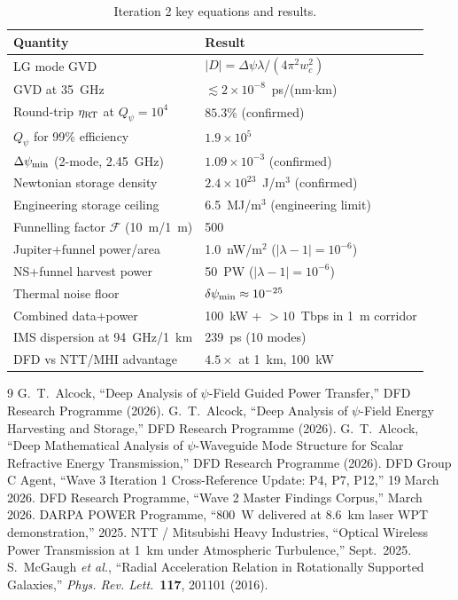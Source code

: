\documentclass[aps,prd,twocolumn,superscriptaddress,nofootinbib]{revtex4-2}
\newcommand{\Qpsi}{Q_\psi}
\begin{document}
\begin{table}[h]
\caption{Iteration 2 key equations and results.}
\label{tab:key-eqs}
\begin{ruledtabular}
\begin{tabular}{ll}
Quantity & Result \\
\hline
LG mode GVD & $|D| = \Delta\psi\lambda/(4\pi^2 w_c^2)$ \\
GVD at 35~GHz & $\lesssim 2\times10^{-8}$~ps/(nm$\cdot$km) \\
Round-trip $\eta_{\rm RT}$ at $\Qpsi=10^4$ & $85.3\%$ (confirmed) \\
$\Qpsi$ for 99\% efficiency & $1.9\times10^5$ \\
$\Delta\psi_{\rm min}$ (2-mode, 2.45~GHz) & $1.09\times10^{-3}$ (confirmed) \\
Newtonian storage density & $2.4\times10^{23}$~J/m$^3$ (confirmed) \\
Engineering storage ceiling & 6.5~MJ/m$^3$ (engineering limit) \\
Funnelling factor $\mathcal{F}$ (10~m/1~m) & 500 \\
Jupiter+funnel power/area & 1.0~nW/m$^2$ ($|\lambda-1|=10^{-6}$) \\
NS+funnel harvest power & 50~PW ($|\lambda-1|=10^{-6}$) \\
Thermal noise floor & $\delta\psi_{\rm min} \approx 10^{-25}$ \\
Combined data+power & 100~kW + $>10$~Tbps in 1~m corridor \\
IMS dispersion at 94~GHz/1~km & 239~ps (10 modes) \\
DFD vs NTT/MHI advantage & $4.5\times$ at 1~km, 100~kW \\
\end{tabular}
\end{ruledtabular}
\end{table}


\begin{thebibliography}{9}
 G.~T.~Alcock, ``Deep Analysis of $\psi$-Field Guided
Power Transfer,'' DFD Research Programme (2026).
 G.~T.~Alcock, ``Deep Analysis of $\psi$-Field Energy
Harvesting and Storage,'' DFD Research Programme (2026).
 G.~T.~Alcock, ``Deep Mathematical Analysis of
$\psi$-Waveguide Mode Structure for Scalar Refractive Energy
Transmission,'' DFD Research Programme (2026).
 DFD Group C Agent, ``Wave 3 Iteration 1 Cross-Reference
Update: P4, P7, P12,'' 19 March 2026.
 DFD Research Programme, ``Wave 2 Master Findings
Corpus,'' March 2026.
 DARPA POWER Programme, ``800~W delivered at 8.6~km
laser WPT demonstration,'' 2025.
 NTT / Mitsubishi Heavy Industries, ``Optical Wireless
Power Transmission at 1~km under Atmospheric Turbulence,'' Sept.~2025.
 S.~McGaugh \textit{et al.}, ``Radial Acceleration
Relation in Rotationally Supported Galaxies,''
\textit{Phys. Rev. Lett.}~\textbf{117}, 201101 (2016).
\end{thebibliography}
\end{document}
